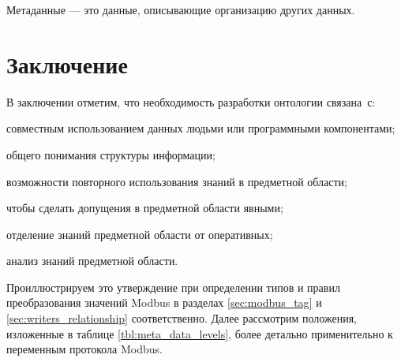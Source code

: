 Метаданные --- это данные, описывающие организацию других данных.

\section*{Заключение}
В заключении отметим, что необходимость разработки онтологии связана~с:
\begin{enumerate*}[label=\arabic*\upshape)]
    \item совместным использованием данных людьми или программными компонентами;
    \item общего понимания структуры информации;
    \item возможности повторного использования знаний в предметной области;
    \item чтобы сделать допущения в предметной области явными;
    \item отделение знаний предметной области от оперативных;
    \item анализ знаний предметной области.
\end{enumerate*}

Проиллюстрируем это утверждение при определении типов и правил преобразования
значений Modbus в разделах \ref{sec:modbus_tag} и \ref{sec:writers_relationship} соответственно.
Далее рассмотрим положения, изложенные в таблице \ref{tbl:meta_data_levels}, более детально применительно к переменным протокола Modbus.
